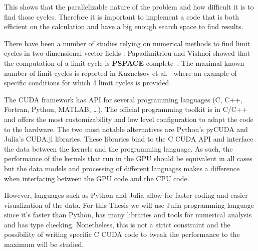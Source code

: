 This shows that the parallelizable nature of the problem and how difficult it is
to find those cycles. Therefore it is important to implement a code that is both
efficient on the calculation and have a big enough search space to find results.

There have been a number of studies relying on numerical methods to find limit
cycles in two dimensional vector fields
\cite{leonov_hidden_2013,van_der_hoff_numerical_2013,casades_computation_2013,gasull_effective_nodate}.
Papadimitriou and Vishnoi showed that the computation of a limit cycle is
\textbf{PSPACE}-complete~\cite{papadimitriou_computational_2015}.
The maximal known number of limit cycles is reported in Kuznetsov et
al.~\cite{kuznetsov_visualization_2013} where an example of specific conditions
for which 4 limit cycles is provided.


The CUDA framework has API for several programming languages (C, C++, Fortran,
Python, MATLAB, \dots). The official programming toolkit is in C/C++ and offers
the most customizability and low level configuration to adapt the code to the
hardware. The two most notable alternatives are Python's pyCUDA and Julia's
CUDA.jl libraries. These libraries bind to the C CUDA API and interface the data
between the kernels and the programming language. As such, the performance of
the kernels that run in the GPU should be equivalent in all cases but the data
models and processing of different languages makes a difference when interfacing
between the GPU code and the CPU code.

However, languages such as Python and Julia allow for faster coding and easier
visualization of the data. For this Thesis we will use Julia programming
language since it's faster than Python, has many libraries and tools for
numerical analysis and has type checking.  Nonetheless, this is not a strict
constraint and the possibility of writing specific C CUDA code to tweak the
performance to the maximum will be studied.

